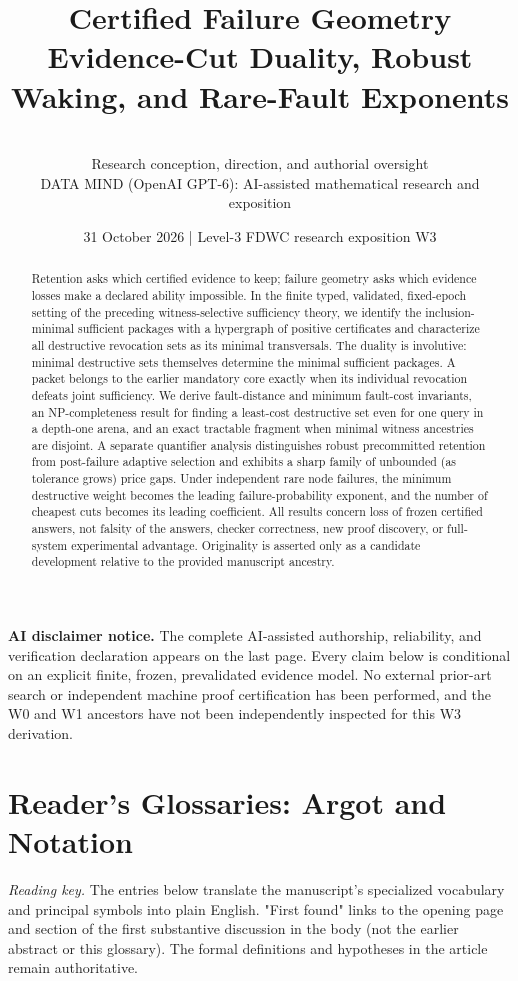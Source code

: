 \documentclass[11pt,letterpaper]{article}
\title{\textbf{Certified Failure Geometry}\\[5pt]
\large Evidence-Cut Duality, Robust Waking, and Rare-Fault Exponents}
\author{\authorname\\
\normalsize Research conception, direction, and authorial oversight\\
\normalsize DATA MIND (OpenAI GPT-6): AI-assisted mathematical research and exposition}
\date{31 October 2026 \quad | \quad Level-3 FDWC research exposition W3}
\begin{document}
\maketitle
\vspace{-0.7em}
\begin{center}
\begin{minipage}{0.91\linewidth}
\small\noindent\textbf{AI disclaimer notice.} The complete AI-assisted authorship, reliability, and verification declaration appears on the last page. Every claim below is conditional on an explicit finite, frozen, prevalidated evidence model. No external prior-art search or independent machine proof certification has been performed, and the W0 and W1 ancestors have not been independently inspected for this W3 derivation.
\end{minipage}
\end{center}
\begin{abstract}
Retention asks which certified evidence to keep; failure geometry asks which evidence losses make a declared ability impossible. In the finite typed, validated, fixed-epoch setting of the preceding witness-selective sufficiency theory, we identify the inclusion-minimal sufficient packages with a hypergraph of positive certificates and characterize all destructive revocation sets as its minimal transversals. The duality is involutive: minimal destructive sets themselves determine the minimal sufficient packages. A packet belongs to the earlier mandatory core exactly when its individual revocation defeats joint sufficiency. We derive fault-distance and minimum fault-cost invariants, an NP-completeness result for finding a least-cost destructive set even for one query in a depth-one arena, and an exact tractable fragment when minimal witness ancestries are disjoint. A separate quantifier analysis distinguishes robust precommitted retention from post-failure adaptive selection and exhibits a sharp family of unbounded (as tolerance grows) price gaps. Under independent rare node failures, the minimum destructive weight becomes the leading failure-probability exponent, and the number of cheapest cuts becomes its leading coefficient. All results concern loss of frozen certified answers, not falsity of the answers, checker correctness, new proof discovery, or full-system experimental advantage. Originality is asserted only as a candidate development relative to the provided manuscript ancestry.
\end{abstract}
\clearpage
\tableofcontents
\clearpage
\clearpage
\section*{Reader's Glossaries: Argot and Notation}
\noindent\emph{Reading key.} The entries below translate the manuscript's specialized vocabulary and principal symbols into plain English. "First found" links to the opening page and section of the first substantive discussion in the body (not the earlier abstract or this glossary). The formal definitions and hypotheses in the article remain authoritative.
\end{document}
